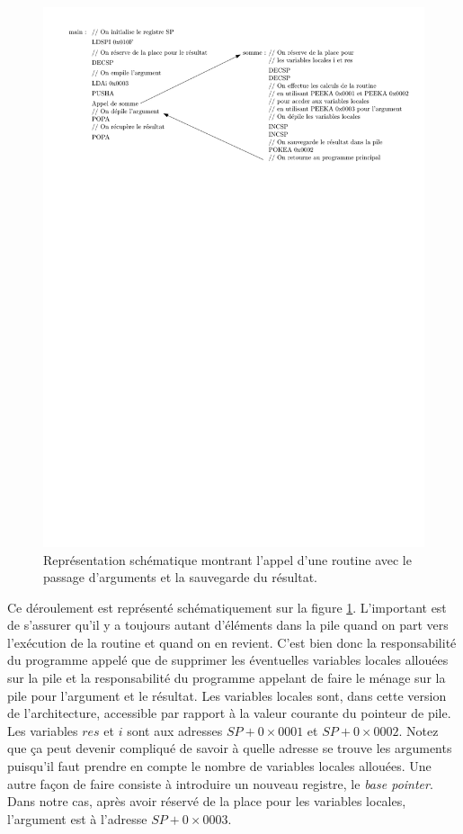 \begin{figure}[htbp]
\includegraphics[width=.9\columnwidth]{Figs/stack_args.pdf}
\caption{\label{fig:stack_args} Représentation schématique montrant l'appel d'une routine avec le passage d'arguments et la sauvegarde du résultat.}
\end{figure}


Ce déroulement est représenté schématiquement sur la figure \ref{fig:stack_args}. L'important est de s'assurer qu'il y a toujours autant d'éléments dans la pile quand on part vers l'exécution de la routine et quand on en revient. C'est bien donc la responsabilité du programme appelé que de supprimer les éventuelles variables locales allouées sur la pile et la responsabilité du programme appelant de faire le ménage sur la pile pour l'argument et le résultat. Les variables locales sont, dans cette version de l'architecture, accessible par rapport à la valeur courante du pointeur de pile. Les variables $res$ et $i$ sont aux adresses $SP + 0\times0001$ et $SP+ 0\times0002$. Notez que ça peut devenir compliqué de savoir à quelle adresse se trouve les arguments puisqu'il faut prendre en compte le nombre de variables locales allouées. Une autre façon de faire consiste à introduire un nouveau registre, le \emph{base pointer}. Dans notre cas, après avoir réservé de la place pour les variables locales, l'argument est à l'adresse $SP + 0\times0003$.

